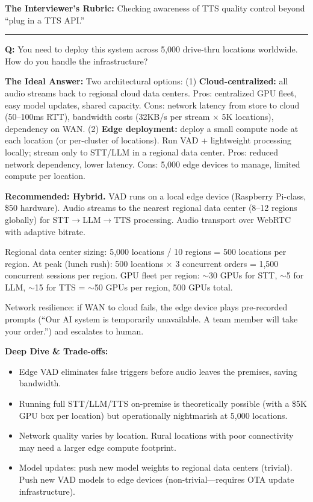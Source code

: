 \textbf{The Interviewer's Rubric:} Checking awareness of TTS quality control beyond ``plug in a TTS API.''

\bigskip\hrule\bigskip

\textbf{Q:} You need to deploy this system across 5,000 drive-thru locations worldwide. How do you handle the infrastructure?

\textbf{The Ideal Answer:} Two architectural options: (1) \textbf{Cloud-centralized:} all audio streams back to regional cloud data centers. Pros: centralized GPU fleet, easy model updates, shared capacity. Cons: network latency from store to cloud (50--100ms RTT), bandwidth costs (32KB/s per stream $\times$ 5K locations), dependency on WAN. (2) \textbf{Edge deployment:} deploy a small compute node at each location (or per-cluster of locations). Run VAD + lightweight processing locally; stream only to STT/LLM in a regional data center. Pros: reduced network dependency, lower latency. Cons: 5,000 edge devices to manage, limited compute per location.

\textbf{Recommended: Hybrid.} VAD runs on a local edge device (Raspberry Pi-class, \$50 hardware). Audio streams to the nearest regional data center (8--12 regions globally) for STT$\rightarrow$LLM$\rightarrow$TTS processing. Audio transport over WebRTC with adaptive bitrate.

Regional data center sizing: 5,000 locations / 10 regions = 500 locations per region. At peak (lunch rush): 500 locations $\times$ 3 concurrent orders = 1,500 concurrent sessions per region. GPU fleet per region: $\sim$30 GPUs for STT, $\sim$5 for LLM, $\sim$15 for TTS = $\sim$50 GPUs per region, 500 GPUs total.

Network resilience: if WAN to cloud fails, the edge device plays pre-recorded prompts (``Our AI system is temporarily unavailable. A team member will take your order.'') and escalates to human.

\textbf{Deep Dive \& Trade-offs:}
\begin{itemize}
  \item Edge VAD eliminates false triggers before audio leaves the premises, saving bandwidth.
  \item Running full STT/LLM/TTS on-premise is theoretically possible (with a \$5K GPU box per location) but operationally nightmarish at 5,000 locations.
  \item Network quality varies by location. Rural locations with poor connectivity may need a larger edge compute footprint.
  \item Model updates: push new model weights to regional data centers (trivial). Push new VAD models to edge devices (non-trivial---requires OTA update infrastructure).
\end{itemize}

